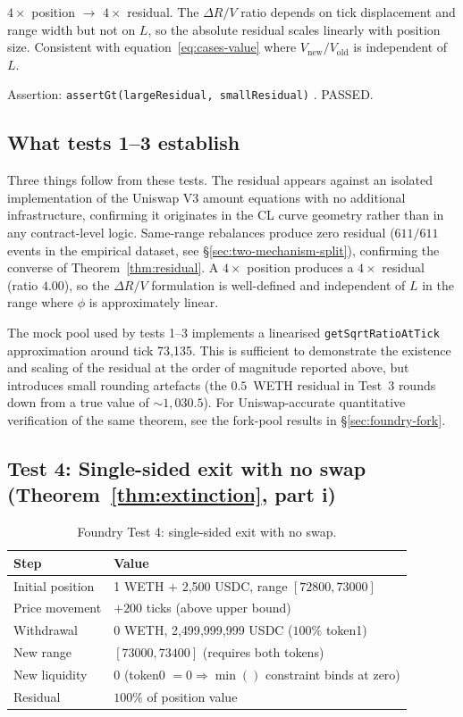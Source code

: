 \documentclass[11pt,a4paper]{article}
\begin{document}
$4\times$ position $\to$ $4\times$ residual. The $\Delta R/V$ ratio depends on tick displacement and range width but not on $L$, so the absolute residual scales linearly with position size. Consistent with equation~\eqref{eq:cases-value} where $V_{\text{new}}/V_{\text{old}}$ is independent of $L$.

Assertion: \texttt{assertGt(largeResidual, smallResidual)} . PASSED.

\subsection{What tests 1--3 establish}\label{sec:foundry-mock-summary}

Three things follow from these tests. The residual appears against an isolated implementation of the Uniswap V3 amount equations with no additional infrastructure, confirming it originates in the CL curve geometry rather than in any contract-level logic. Same-range rebalances produce zero residual ($611/611$ events in the empirical dataset, see \S\ref{sec:two-mechanism-split}), confirming the converse of Theorem~\ref{thm:residual}. A $4\times$ position produces a $4\times$ residual (ratio $4.00$), so the $\Delta R/V$ formulation is well-defined and independent of $L$ in the range where $\phi$ is approximately linear.

The mock pool used by tests 1--3 implements a linearised \texttt{getSqrtRatioAtTick} approximation around tick 73{,}135. This is sufficient to demonstrate the existence and scaling of the residual at the order of magnitude reported above, but introduces small rounding artefacts (the $0.5$~WETH residual in Test~3 rounds down from a true value of $\sim 1{,}030.5$). For Uniswap-accurate quantitative verification of the same theorem, see the fork-pool results in \S\ref{sec:foundry-fork}.

\subsection{Test 4: Single-sided exit with no swap (Theorem~\ref{thm:extinction}, part i)}\label{sec:foundry-mock-extinction}

\begin{table}[H]
\centering
\caption{Foundry Test 4: single-sided exit with no swap.}\label{tab:foundry-test4}
\begin{tabular}{@{}ll@{}}
\toprule
Step & Value \\
\midrule
Initial position & 1 WETH $+$ 2{,}500 USDC, range $[72800, 73000]$ \\
Price movement   & $+200$ ticks (above upper bound) \\
Withdrawal       & 0 WETH, 2{,}499{,}999{,}999 USDC ($100\%$ token1) \\
New range        & $[73000, 73400]$ (requires both tokens) \\
New liquidity    & 0 (token0 $= 0 \Rightarrow \min()$ constraint binds at zero) \\
Residual & $100\%$ of position value \\
\bottomrule
\end{tabular}
\end{table}
\end{document}
